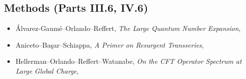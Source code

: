 \subsection*{Methods (Parts III.6, IV.6)}
\begin{itemize}
\item[$\bullet$] \'Alvarez-Gaum\'e--Orlando--Reffert, \emph{The Large Quantum Number Expansion}, 
\item[$\bullet$] Aniceto--Ba\c{s}ar--Schiappa, \emph{A Primer on Resurgent Transseries}, 
\item[$\circ$] Hellerman--Orlando--Reffert--Watanabe, \emph{On the CFT Operator Spectrum at Large Global Charge}, 
\end{itemize}
\fussy %
